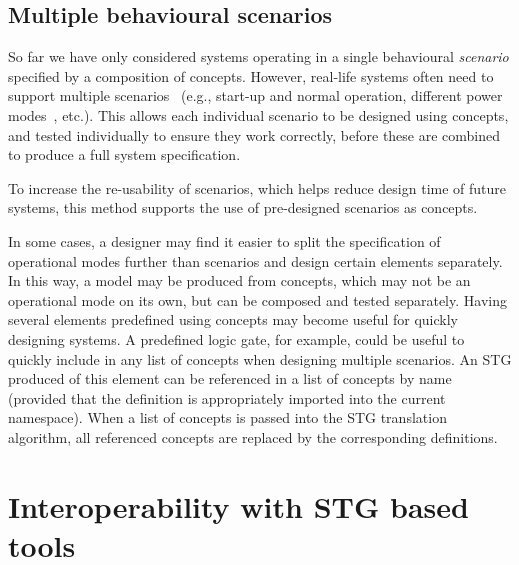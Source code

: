 \documentclass[british,compsoc]{IEEEtran}
\begin{document}



\subsection{Multiple behavioural scenarios \label{sub:scenarios}}



So far we have only considered systems operating in a single behavioural
\textit{scenario} specified by a composition of concepts. However,
real-life systems often need to support multiple scenarios~ (e.g.,
start-up and normal operation, different power modes~\cite{microadapt},
etc.). This allows each individual scenario to be designed using concepts,
and tested individually to ensure they work correctly, before these
are combined to produce a full system specification.

To increase the re-usability of scenarios, which helps reduce design
time of future systems, this method supports the use of pre-designed
scenarios as concepts.

In some cases, a designer may find it easier to split the specification
of operational modes further than scenarios and design certain elements
separately. In this way, a model may be produced from concepts, which
may not be an operational mode on its own, but can be composed and
tested separately. Having several elements predefined
using concepts may become useful for quickly designing systems. A
predefined logic gate, for example, could be useful to quickly include
in any list of concepts when designing multiple scenarios. An STG
produced of this element can be referenced in a list of concepts by
name (provided that the definition is appropriately imported into
the current namespace). When a list of concepts is passed into the
STG translation algorithm, all referenced concepts are replaced by
the corresponding definitions.




\section{Interoperability with STG based tools \label{sec:interop-with-stg}}
\end{document}
